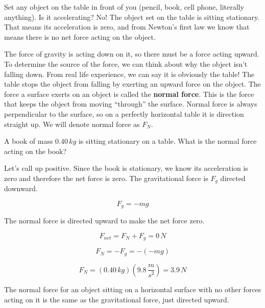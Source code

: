 \documentclass[12pt]{book}
\begin{document}
Set any object on the table in front of you (pencil, book, cell phone, literally anything). Is it accelerating? No! The object set on the table is sitting stationary. That means its acceleration is zero, and from Newton's first law we know that means there is no net force acting on the object.

The force of gravity is acting down on it, so there must be a force acting upward. To determine the source of the force, we can think about why the object isn't falling down. From real life experience, we can say it is obviously the table! The table stops the object from falling by exerting an upward force on the object. The force a surface exerts on an object is called the \textbf{normal force}. This is the force that keeps the object from moving ``through'' the surface. Normal force is always perpendicular to the surface, so on a perfectly horizontal table it is direction straight up. We will denote normal force as $F_N$.

\begin{exampleblock}


A book of mass $0.40 \, kg$ is sitting stationary on a table. What is the normal force acting on the book?

\hspace{10pt}

Let's call up positive. Since the book is stationary, we know its acceleration is zero and therefore the net force is zero. The gravitational force is $F_g$ directed downward. 

\begin{equation}
F_g = -mg
\end{equation}

The normal force is directed upward to make the net force zero.

\begin{equation}
F_{net} = F_N + F_g = 0 \, N
\end{equation}

\begin{equation}
F_N = -F_g = -(-mg)
\end{equation}

\begin{equation}
F_N = (0.40 \, kg) (9.8 \, \frac{m}{s^2}) = 3.9 \, N
\end{equation}

The normal force for an object sitting on a horizontal surface with no other forces acting on it is the same as the gravitational force, just directed upward.

\end{exampleblock}
\end{document}
